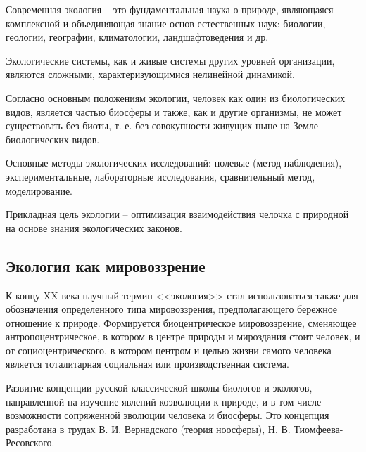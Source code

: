 \documentclass[a5paper, 11pt]{extarticle}
\theoremstyle{definition}
\theoremstyle{definition}
\theoremstyle{definition}
\numberwithin{figure}{section}
\begin{document}
Современная экология -- это фундаментальная наука о природе, являющаяся комплексной и объединяющая знание основ естественных наук: биологии, геологии, географии, климатологии, ландшафтоведения и др.

Экологические системы, как и живые системы других уровней организации, являются сложными, характеризующимися нелинейной динамикой.

Согласно основным положениям экологии, человек как один из биологических видов, является частью биосферы и также, как и другие организмы, не может существовать без биоты, т. е. без совокупности живущих ныне на Земле биологических видов.

Основные методы экологических исследований: полевые (метод наблюдения), экспериментальные, лабораторные исследования, сравнительный метод, моделирование.

Прикладная цель экологии -- оптимизация взаимодействия челочка с природной на основе знания экологических законов.

\subsection{Экология как мировоззрение}

К концу XX века научный термин <<экология>> стал использоваться также для обозначения определенного типа мировоззрения, предполагающего бережное отношение к природе. Формируется биоцентрическое мировоззрение, сменяющее антропоцентрическое, в котором в центре природы и мироздания стоит человек, и от социоцентрического, в котором центром и целью жизни самого человека является тоталитарная социальная или производственная система.

Развитие концепции русской классической школы биологов и экологов, направленной на изучение явлений коэволюции к природе, и в том числе возможности сопряженной эволюции человека и биосферы. Это концепция разработана в трудах В. И. Вернадского (теория ноосферы), Н. В. Тиомфеева-Ресовского.


\end{document}
